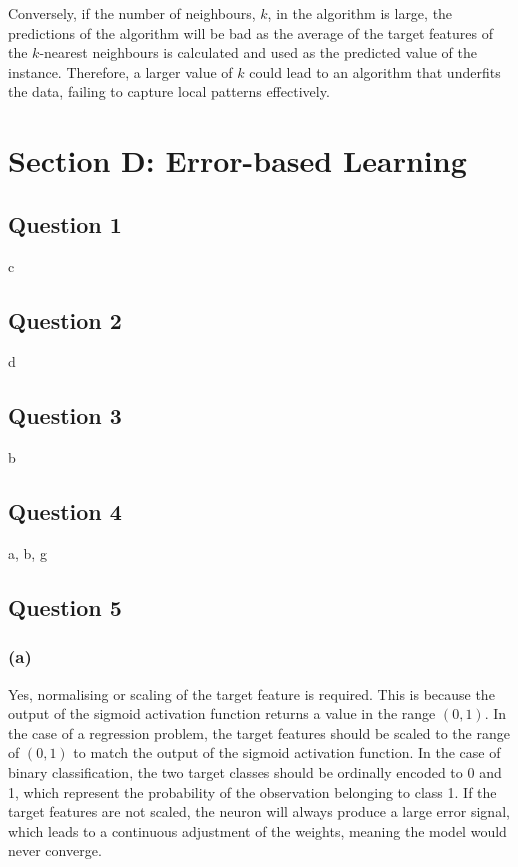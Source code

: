 \documentclass[10pt]{article}
\begin{document}
Conversely, if the number of neighbours, $k$, in the algorithm is large, the predictions of the algorithm will be bad
as the average of the target features of the $k$-nearest neighbours is calculated and used as the predicted value of the
instance. Therefore, a larger value of $k$ could lead to an algorithm that underfits the data, failing to capture local
patterns effectively.

\section*{Section D: Error-based Learning}

\subsection*{Question 1}

c

\subsection*{Question 2}

d

\subsection*{Question 3}

b

\subsection*{Question 4}

a, b, g

\subsection*{Question 5}

\subsubsection*{(a)}

Yes, normalising or scaling of the target feature is required. This is because the output of the sigmoid
activation function returns a value in the range $(0,1)$. In the case of a regression problem, the target features should
be scaled to the range of $(0,1)$ to match the output of the sigmoid activation function. In the case of binary classification,
the two target classes should be ordinally encoded to 0 and 1, which represent the probability of the observation belonging to class 1.
If the target features are not scaled, the neuron will always produce a large error signal, which leads to a continuous adjustment of the
weights, meaning the model would never converge.
\end{document}
